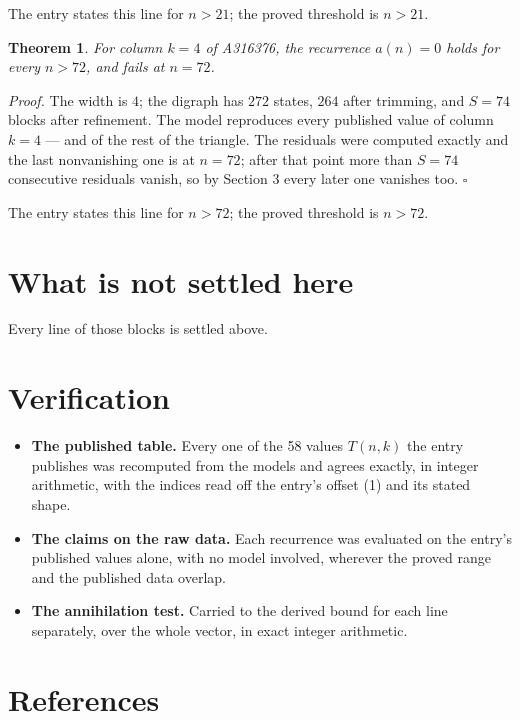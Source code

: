 \documentclass[11pt]{article}
\newtheorem{theorem}{Theorem}
\theoremstyle{definition}
\begin{document}
The entry states this line for $n > 21$; the proved threshold is $n > 21$.

\begin{theorem} For column $k = 4$ of A316376, the recurrence $a(n) = 0$ holds for every $n > 72$, and fails at $n = 72$.\end{theorem}

{\itshape Proof.} The width is $4$; the digraph has $272$ states, $264$ after trimming, and $S = 74$ blocks after refinement. The model reproduces every published value of column $k = 4$ --- and of the rest of the triangle. The residuals were computed exactly and the last nonvanishing one is at $n = 72$; after that point more than $S = 74$ consecutive residuals vanish, so by Section 3 every later one vanishes too. $\square$

The entry states this line for $n > 72$; the proved threshold is $n > 72$.

\section{What is not settled here}

Every line of those blocks is settled above.

\section{Verification}

\begin{itemize}

\item {\bfseries The published table.} Every one of the 58 values $T(n,k)$ the entry publishes was recomputed from the models and agrees exactly, in integer arithmetic, with the indices read off the entry's offset (1) and its stated shape.

\item {\bfseries The claims on the raw data.} Each recurrence was evaluated on the entry's published values alone, with no model involved, wherever the proved range and the published data overlap.

\item {\bfseries The annihilation test.} Carried to the derived bound for each line separately, over the whole vector, in exact integer arithmetic.

\end{itemize}

\section{References}
\end{document}
